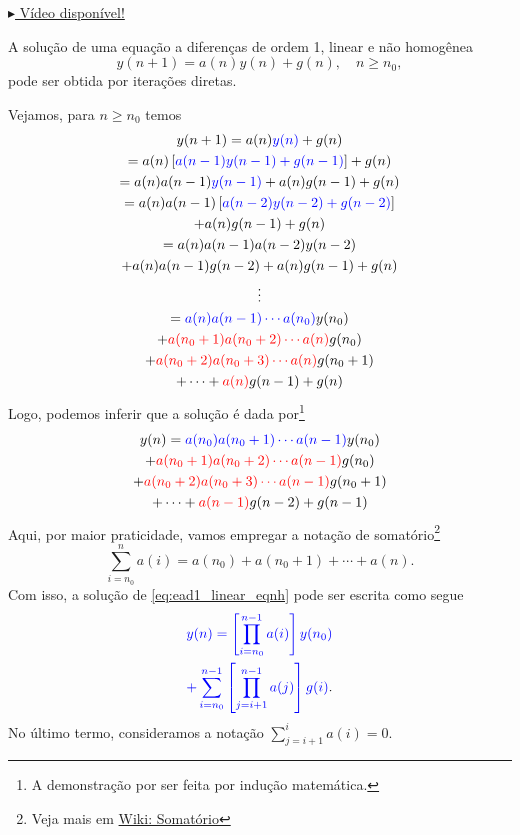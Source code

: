\begin{flushright}
  \href{https://archive.org/details/ead-o1nh}{$\blacktriangleright$ Vídeo disponível!}
\end{flushright}

A solução de uma equação a diferenças de ordem 1, linear e não homogênea
\begin{equation}\label{eq:ead1_linear_eqnh}
  y(n+1) = a(n)y(n) + g(n),\quad n\geq n_0,
\end{equation}
pode ser obtida por iterações diretas.

Vejamos, para $n\geq n_0$ temos
\begin{gather}
  y(n+1) = a(n){\color{blue}y(n)} + g(n) \\
  = a(n)\left[{\color{blue}a(n-1)y(n-1)+g(n-1)}\right] + g(n) \\
  = a(n)a(n-1){\color{blue}y(n-1)}+a(n)g(n-1) + g(n) \\
  = a(n)a(n-1)\left[{\color{blue}a(n-2)y(n-2)+g(n-2)}\right] \nonumber\\
  + a(n)g(n-1) + g(n) \\
  = a(n)a(n-1)a(n-2)y(n-2) \nonumber\\
  + a(n)a(n-1)g(n-2) + a(n)g(n-1) + g(n) \\
  \vdots\nonumber\\
  = {\color{blue}a(n)a(n-1)\cdots a(n_0)}y(n_0) \nonumber\\
  + {\color{red}a(n_0+1)a(n_0+2)\cdots a(n)}g(n_0) \nonumber\\
  + {\color{red}a(n_0+2)a(n_0+3)\cdots a(n)}g(n_0+1) \nonumber\\
  + \cdots + {\color{red}a(n)}g(n-1) + g(n)
\end{gather}
Logo, podemos inferir que a solução é dada por\footnote{A demonstração por ser feita por indução matemática.}
\begin{gather}
  y(n) = {\color{blue}a(n_0)a(n_0+1)\cdots a(n-1)}y(n_0) \nonumber\\
  + {\color{red}a(n_0+1)a(n_0+2)\cdots a(n-1)}g(n_0) \nonumber\\
  + {\color{red}a(n_0+2)a(n_0+3)\cdots a(n-1)}g(n_0+1) \nonumber\\
  + \cdots + {\color{red}a(n-1)}g(n-2) + g(n-1)
\end{gather}
Aqui, por maior praticidade, vamos empregar a notação de somatório\footnote{Veja mais em \href{https://pt.wikipedia.org/wiki/Somat\%C3\%B3rio}{Wiki: Somatório}}
\begin{equation}
  \sum_{i=n_0}^{n} a(i) = a(n_0) + a(n_0+1) + \cdots + a(n).
\end{equation}
Com isso, a solução de \eqref{eq:ead1_linear_eqnh} pode ser escrita como segue
\begin{gather}
  {\color{blue}y(n) = \left[\prod_{i=n_0}^{n-1} a(i)\right]y(n_0)} \nonumber\\
  {\color{blue}+ \sum_{i=n_0}^{n-1}\left[\prod_{j=i+1}^{n-1} a(j)\right]g(i)}. \label{eq:ead1_linear_eqnh_sol}
\end{gather}
No último termo, consideramos a notação $\sum_{j=i+1}^i a(i) = 0$.

